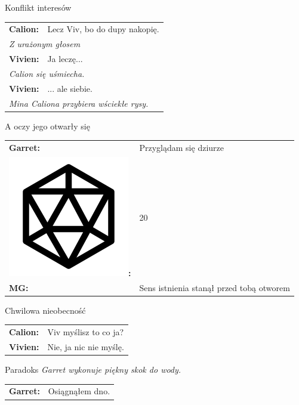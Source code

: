 \documentclass[10pt,twoside,twocolumn]{book}
\begin{document}
\begin{rpg-quotebox}{Konflikt interesów}
   \begin{tabularx}{\columnwidth}{lX}
      \textbf{Calion:} & Lecz Viv, bo do dupy nakopię.\\
      \multicolumn{2}{X}{\textit{Z urażonym głosem}}\\
      \textbf{Vivien:} & Ja leczę...\\
      \multicolumn{2}{X}{\textit{Calion się uśmiecha.}}\\
      \textbf{Vivien:} & ... ale siebie.\\
      \multicolumn{2}{X}{\textit{Mina Caliona przybiera wściekłe rysy.}}
   \end{tabularx}
\end{rpg-quotebox}


\begin{rpg-quotebox}{A oczy jego otwarły się}
   \begin{tabularx}{\columnwidth}{lX}
      \textbf{Garret:} & Przyglądam się dziurze\\
      \includegraphics[scale=0.06]{img/d20.png}\textbf{:}& 20\\
      \textbf{MG:} & Sens istnienia stanął przed tobą otworem\\
   \end{tabularx}
\end{rpg-quotebox}


\begin{rpg-quotebox}{Chwilowa nieobecność}
   \begin{tabularx}{\columnwidth}{lX}
      \textbf{Calion:} & Viv myślisz to co ja?\\
      \textbf{Vivien:} & Nie, ja nic nie myślę.\\
   \end{tabularx}
\end{rpg-quotebox}


\begin{rpg-quotebox}{Paradoks}
   \textit{Garret wykonuje piękny skok do wody.}\\
   \newline
   \begin{tabularx}{\columnwidth}{lX}
      \textbf{Garret:} & Osiągnąłem dno.\\
   \end{tabularx}
\end{rpg-quotebox}
\end{document}
